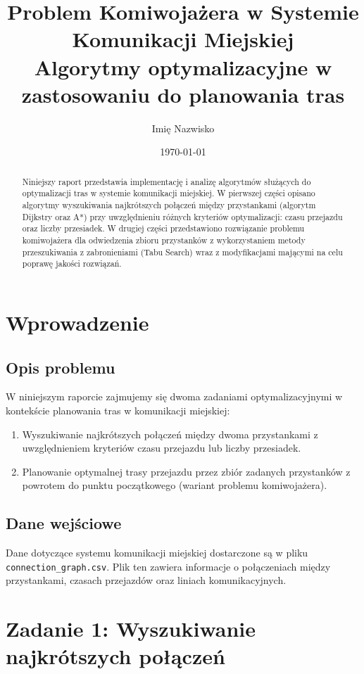 \documentclass[12pt,a4paper]{article}
\title{\LARGE \textbf{Problem Komiwojażera w Systemie Komunikacji Miejskiej}\\
\large Algorytmy optymalizacyjne w zastosowaniu do planowania tras}
\author{Imię Nazwisko}
\date{\today}
\begin{document}
\maketitle

\begin{abstract}
    Niniejszy raport przedstawia implementację i analizę algorytmów służących do optymalizacji tras w systemie komunikacji miejskiej. W pierwszej części opisano algorytmy wyszukiwania najkrótszych połączeń między przystankami (algorytm Dijkstry oraz A*) przy uwzględnieniu różnych kryteriów optymalizacji: czasu przejazdu oraz liczby przesiadek. W drugiej części przedstawiono rozwiązanie problemu komiwojażera dla odwiedzenia zbioru przystanków z wykorzystaniem metody przeszukiwania z zabronieniami (Tabu Search) wraz z modyfikacjami mającymi na celu poprawę jakości rozwiązań.
\end{abstract}

\tableofcontents
\newpage

\section{Wprowadzenie}
\subsection{Opis problemu}
W niniejszym raporcie zajmujemy się dwoma zadaniami optymalizacyjnymi w kontekście planowania tras w komunikacji miejskiej:
\begin{enumerate}
    \item Wyszukiwanie najkrótszych połączeń między dwoma przystankami z uwzględnieniem kryteriów czasu przejazdu lub liczby przesiadek.
    \item Planowanie optymalnej trasy przejazdu przez zbiór zadanych przystanków z powrotem do punktu początkowego (wariant problemu komiwojażera).
\end{enumerate}

\subsection{Dane wejściowe}
Dane dotyczące systemu komunikacji miejskiej dostarczone są w pliku \texttt{connection\_graph.csv}. Plik ten zawiera informacje o połączeniach między przystankami, czasach przejazdów oraz liniach komunikacyjnych.

\section{Zadanie 1: Wyszukiwanie najkrótszych połączeń}
\end{document}
